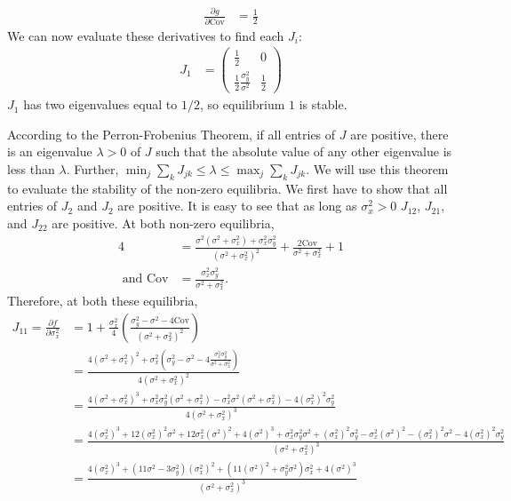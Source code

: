 \documentclass{article}
\newcommand{\Cov}{\text{Cov}}
\begin{document}
\begin{enumerate}
\begin{align*}
\\ \frac{\partial g}{\partial \Cov}&=\frac{1}{2}
\end{align*}
We can now evaluate these derivatives to find each $J_i$:
\begin{align*}
J_1&=\left(\begin{array}{cc}\frac{1}{2} & 0 \\ \frac{1}{2}\frac{\sigma_y^2}{\sigma^2} & \frac{1}{2} \end{array}\right)
\end{align*}
$J_1$ has two eigenvalues equal to $1/2$, so equilibrium $1$ is stable. 


According to the Perron-Frobenius Theorem, if all entries of $J$ are positive, there is an eigenvalue $\lambda>0$ of $J$ such that the absolute value of any other eigenvalue is less than $\lambda$. Further, $\min_j\sum_k J_{jk}\leq \lambda\leq \max_j\sum_k J_{jk}$. We will use this theorem to evaluate the stability of the non-zero equilibria. We first have to show that all entries of $J_2$ and $J_2$ are positive. It is easy to see that as long as $\sigma_x^2>0$ $J_{12}$, $J_{21}$, and $J_{22}$ are positive. At both non-zero equilibria,
\begin{align*}
4&=\frac{\sigma^2(\sigma^2+\sigma_x^2)+\sigma_x^2\sigma_y^2}{(\sigma^2+\sigma_x^2)^2}+\frac{2\Cov}{\sigma^2+\sigma_x^2}+1
\\ \text{ and } \Cov &=\frac{\sigma_x^2\sigma_y^2}{\sigma^2+\sigma_x^2}.
\end{align*}
Therefore, at both these equilibria, 
\begin{align*}
J_{11}=\frac{\partial f}{\partial \sigma_x^2}&= 1 + \frac{\sigma_x^2}{4}\left(\frac{\sigma_y^2-\sigma^2-4\Cov}{(\sigma^2+\sigma_x^2)^2}\right)
\\&=\frac{4(\sigma^2+\sigma_x^2)^2+\sigma_x^2\left(\sigma_y^2-\sigma^2-4\frac{\sigma_x^2\sigma_y^2}{\sigma^2+\sigma_x^2}\right)}{4(\sigma^2+\sigma_x^2)^2}
\\&=\frac{4(\sigma^2+\sigma_x^2)^3+\sigma_x^2\sigma_y^2(\sigma^2+\sigma_x^2)-\sigma_x^2\sigma^2(\sigma^2+\sigma_x^2)-4(\sigma_x^2)^2\sigma_y^2}{4(\sigma^2+\sigma_x^2)^3}
\\&=\frac{4(\sigma_x^2)^3+12(\sigma_x^2)^2\sigma^2+12\sigma_x^2(\sigma^2)^2+4(\sigma^2)^3+\sigma_x^2\sigma_y^2\sigma^2+(\sigma_x^2)^2\sigma_y^2-\sigma_x^2(\sigma^2)^2-(\sigma_x^2)^2\sigma^2-4(\sigma_x^2)^2\sigma_y^2}{(\sigma^2+\sigma_x^2)^3}
\\&=\frac{4(\sigma_x^2)^3+(11\sigma^2-3\sigma_y^2)(\sigma_x^2)^2+(11(\sigma^2)^2+\sigma_y^2\sigma^2)\sigma_x^2+4(\sigma^2)^3}{(\sigma^2+\sigma_x^2)^3}

\end{align*}
\end{enumerate}
\end{document}
